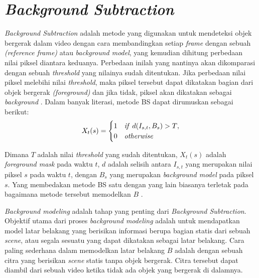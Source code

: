 \section{\textit{Background Subtraction}}
    \textit{Background Subtraction} adalah metode yang digunakan untuk mendeteksi objek bergerak dalam video dengan cara membandingkan setiap \textit{frame} dengan sebuah \textit{(reference frame)} atau \textit{background model}, yang kemudian dihitung perbedaan nilai piksel diantara keduanya. Perbedaan inilah yang nantinya akan dikomparasi dengan sebuah \textit{threshold} yang nilainya sudah ditentukan. Jika perbedaan nilai piksel melebihi nilai \textit{threshold}, maka piksel tersebut dapat dikatakan bagian dari objek bergerak \textit{(foreground)} dan jika tidak, piksel akan dikatakan sebagai \textit{background} \citep{Desai2014}. Dalam banyak literasi, metode BS dapat dirumuskan sebagai berikut:
    \begin{equation}\label{eq:2.3}
    X_t (s) =
    \begin{cases} 
          1 &\text{\textit{if} $d(I_{s,t}, B_s) > T$}, \\
          0 &\text{\textit{otherwise}}
    \end{cases}
    \end{equation}
    
    Dimana $T$ adalah nilai \textit{threshold} yang sudah ditentukan, $X_t (s)$ adalah \textit{foreground mask} pada waktu $t$, $d$ adalah selisih antara $I_{s,t}$ yang merupakan nilai piksel $s$ pada waktu $t$, dengan $B_s$ yang merupakan \textit{background model} pada piksel $s$. Yang membedakan metode BS satu dengan yang lain biasanya terletak pada bagaimana metode tersebut memodelkan $B$ \citep{Benezeth2010}.
    
    \textit{Background modeling} adalah tahap yang penting dari \textit{Background Subtraction}. Objektif utama dari proses \textit{background modeling} adalah untuk mendapatkan model latar belakang yang berisikan informasi berupa bagian statis dari sebuah \textit{scene}, atau segala sesuatu yang dapat dikatakan sebagai latar belakang. Cara paling sederhana dalam memodelkan latar belakang $B$ adalah dengan sebuah citra yang berisikan \textit{scene} statis tanpa objek bergerak. Citra tersebut dapat diambil dari sebuah video ketika tidak ada objek yang bergerak di dalamnya.
    
